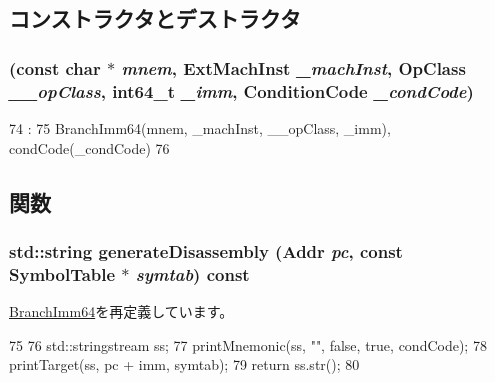 \subsection{コンストラクタとデストラクタ}
\hypertarget{classArmISA_1_1BranchImmCond64_a536716b0bdc08118996466975aadb573}{
\subsubsection[{BranchImmCond64}]{ (const char $\ast$ {\em mnem}, \/  {\bf ExtMachInst} {\em \_\-machInst}, \/  OpClass {\em \_\-\_\-opClass}, \/  int64\_\-t {\em \_\-imm}, \/  {\bf ConditionCode} {\em \_\-condCode})}}
\label{classArmISA_1_1BranchImmCond64_a536716b0bdc08118996466975aadb573}



\begin{DoxyCode}
74                                                            :
75         BranchImm64(mnem, _machInst, __opClass, _imm), condCode(_condCode)
76     {}

\end{DoxyCode}


\subsection{関数}
\hypertarget{classArmISA_1_1BranchImmCond64_a95d323a22a5f07e14d6b4c9385a91896}{
\subsubsection[{generateDisassembly}]{\setlength{\rightskip}{0pt plus 5cm}std::string generateDisassembly ({\bf Addr} {\em pc}, \/  const SymbolTable $\ast$ {\em symtab}) const}}
\label{classArmISA_1_1BranchImmCond64_a95d323a22a5f07e14d6b4c9385a91896}


\hyperlink{classArmISA_1_1BranchImm64_a95d323a22a5f07e14d6b4c9385a91896}{BranchImm64}を再定義しています。


\begin{DoxyCode}
75 {
76     std::stringstream ss;
77     printMnemonic(ss, "", false, true, condCode);
78     printTarget(ss, pc + imm, symtab);
79     return ss.str();
80 }
\end{DoxyCode}


